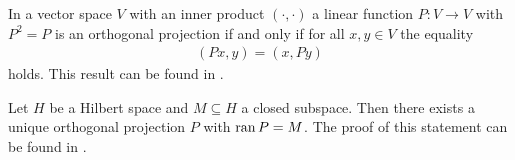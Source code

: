\begin{remark}
	In a vector space $V$ with an inner product $(\cdot, \cdot)$ a linear function $P: V \to V$ with $P^2 = P$ is an orthogonal projection if and only if for all $x,y \in V$ the equality
	\begin{align*}
		(Px, y) = (x,Py)
	\end{align*}
	holds. This result can be found in \cite[p. 47]{FAna1}.
\end{remark}


\begin{remark} \label{remark:orth_proj_uniqueness}
	Let $H$ be a Hilbert space and $M \subseteq H$ a closed subspace. Then there exists a unique orthogonal projection $P$ with $\operatorname{ran} P = M$. The proof of this statement can be found in \cite[p. 48]{FAna1}.
\end{remark}